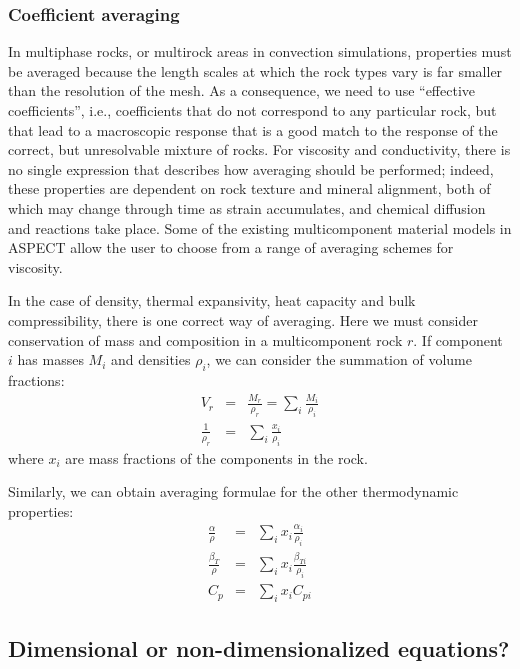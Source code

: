 \documentclass{article}
\newcommand{\aspect}{\textsc{ASPECT}}
\begin{document}
\subsubsection{Coefficient averaging}
In multiphase rocks, or multirock areas in convection simulations, properties must be averaged
because the length scales at which the rock types vary is far smaller than the resolution of the mesh.
As a consequence, we need to use ``effective coefficients'', i.e., coefficients that do not
correspond to any particular rock, but that lead to a macroscopic response that is a good match
to the response of the correct, but unresolvable mixture of rocks.
For viscosity and conductivity, there is no single expression that describes how averaging should
be performed; indeed, these properties are dependent on rock texture and mineral alignment,
both of which may change through time as strain accumulates, and chemical diffusion and
reactions take place. Some of the existing multicomponent material models in \aspect{} allow the
user to choose from a range of averaging schemes for viscosity.

In the case of density, thermal expansivity, heat capacity and bulk compressibility, there is
one correct way of averaging. Here we must consider conservation of mass and composition in a
multicomponent rock $r$. If component $i$ has masses $M_i$ and densities $\rho_i$, we
can consider the summation of volume fractions:
\begin{eqnarray}
  V_r &=& \frac{M_r}{\rho_r} = \sum_i \frac{M_i}{\rho_i} \\
  \frac{1}{\rho_r} &=& \sum_i \frac{x_i}{\rho_i}
\end{eqnarray}
where $x_i$ are mass fractions of the components in the rock.

Similarly, we can obtain averaging formulae for the other thermodynamic properties:
\begin{eqnarray}
  \frac{\alpha}{\rho} &=& \sum_i x_i \frac{\alpha_i}{\rho_{i}} \\
  \frac{\beta_T}{\rho} &=& \sum_i x_i \frac{\beta_{Ti}}{\rho_{i}} \\
  C_p &=& \sum_i x_i C_{pi}
\end{eqnarray}

\subsection{Dimensional or non-dimensionalized equations?}
\label{sec:non-dimensional}
\end{document}
